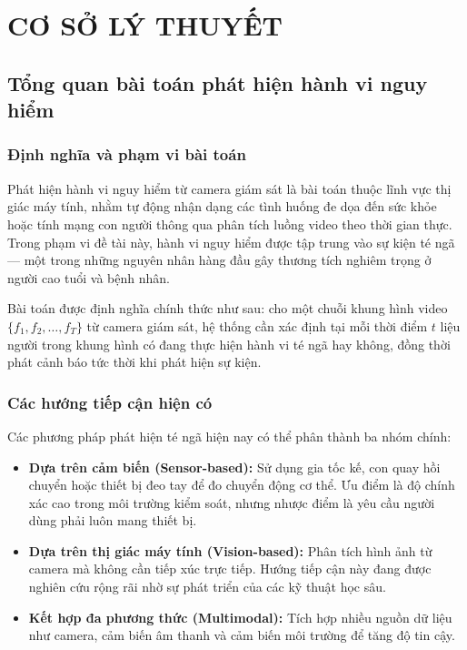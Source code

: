 \chapter{CƠ SỞ LÝ THUYẾT}

\section{Tổng quan bài toán phát hiện hành vi nguy hiểm}

\subsection{Định nghĩa và phạm vi bài toán}

Phát hiện hành vi nguy hiểm từ camera giám sát là bài toán thuộc lĩnh vực thị giác máy tính, nhằm tự động nhận dạng các tình huống đe dọa đến sức khỏe hoặc tính mạng con người thông qua phân tích luồng video theo thời gian thực. Trong phạm vi đề tài này, hành vi nguy hiểm được tập trung vào sự kiện té ngã — một trong những nguyên nhân hàng đầu gây thương tích nghiêm trọng ở người cao tuổi và bệnh nhân.

Bài toán được định nghĩa chính thức như sau: cho một chuỗi khung hình video $\{f_1, f_2, \ldots, f_T\}$ từ camera giám sát, hệ thống cần xác định tại mỗi thời điểm $t$ liệu người trong khung hình có đang thực hiện hành vi té ngã hay không, đồng thời phát cảnh báo tức thời khi phát hiện sự kiện.

\subsection{Các hướng tiếp cận hiện có}

Các phương pháp phát hiện té ngã hiện nay có thể phân thành ba nhóm chính:

\begin{itemize}
    \item \textbf{Dựa trên cảm biến (Sensor-based):} Sử dụng gia tốc kế, con quay hồi chuyển hoặc thiết bị đeo tay để đo chuyển động cơ thể. Ưu điểm là độ chính xác cao trong môi trường kiểm soát, nhưng nhược điểm là yêu cầu người dùng phải luôn mang thiết bị.

    \item \textbf{Dựa trên thị giác máy tính (Vision-based):} Phân tích hình ảnh từ camera mà không cần tiếp xúc trực tiếp. Hướng tiếp cận này đang được nghiên cứu rộng rãi nhờ sự phát triển của các kỹ thuật học sâu.

    \item \textbf{Kết hợp đa phương thức (Multimodal):} Tích hợp nhiều nguồn dữ liệu như camera, cảm biến âm thanh và cảm biến môi trường để tăng độ tin cậy.
\end{itemize}

